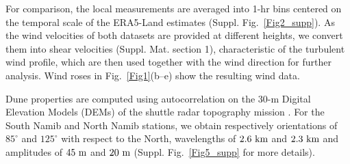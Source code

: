 For comparison, the local measurements are averaged into 1-hr bins centered on the temporal scale of the ERA5-Land estimates (Suppl. Fig.~\ref{Fig2_supp}). As the wind velocities of both datasets are provided at different heights, we convert them into shear velocities (Suppl. Mat. section 1), characteristic of the turbulent wind profile, which are then used together with the wind direction for further analysis. Wind roses in Fig.~\ref{Fig1}(b--e) show the resulting wind data.

Dune properties are computed using autocorrelation on the 30-m Digital Elevation Models (DEMs) of the shuttle radar topography mission \citep{Farr2007}. For the South Namib and North Namib stations, we obtain respectively orientations of $85^\circ$ and $125^\circ$ with respect to the North, wavelengths of $2.6~\textup{km}$ and $2.3~\textup{km}$ and amplitudes of $45~\textup{m}$ and $20~\textup{m}$ (Suppl. Fig.~\ref{Fig5_supp} for more details).


